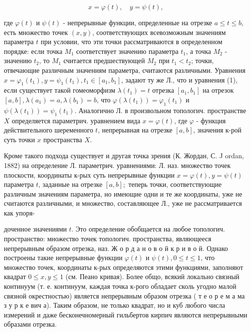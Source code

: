 \documentclass[10pt]{article}
\begin{document}
\[

x=\varphi(t), \quad y=\psi(t),

\]



где $\varphi(t)$ и $\psi(t)$ - непрерывные функции, определенные на отрезке $a \leqslant t \leqslant b$, есть множество точек $(x, y)$, соответствующих всевозможным значениям параметра $t$ при условии, что эти точки рассматриваются в определенном порядке: если точка $M_{1}$ соответствует значению параметра $t_{1}$, а точка $M_{2}$ - значению $t_{2}$, то $M_{1}$ считается предшествующей $M_{2}$ при $t_{1}<t_{2}$; точки, отвечающие различным значениям параметра, считаются различными. Уравнения $x=\varphi_{1}\left(t_{1}\right), y=\psi_{1}\left(t_{1}\right), t_{1} \in\left[a_{1}, b_{1}\right]$, задают ту же Л., что и уравнения (1), если существует такой гомеоморфизм $\lambda\left(t_{1}\right)=t$ отрезка $\left[a_{1}, b_{1}\right]$ на отрезок $[a, b], \lambda\left(a_{1}\right)=a, \lambda\left(b_{1}\right)=b$, что $\varphi\left(\lambda\left(t_{1}\right)\right)=\varphi_{1}\left(t_{1}\right)$ и $\psi\left(\lambda\left(t_{1}\right)\right)=\psi_{1}\left(t_{1}\right)$. Аналогично Л. в произвольном топологич. пространстве $X$ определяется параметрич. уравнением вида $x=\varphi(t)$, где $\varphi$ - функция действительного шеременного $t$, непрерывная на отрезке $[a, b]$, значения к-рой суть точки $x$ пространства $X$.



Кроме такого подхода существует и другая точка зрения (К. Жордан, С. J ordan, 1882) на определение Л. параметрич. уравнениями: Л. наз. множество точек плоскости, координаты к-рых суть непрерывные функции $x=\varphi(t), y=\psi(t)$ параметра $t$, заданные на отрезке $[a, b] ;$ теперь точки, соответствующие различным значениям параметра, но имеющие одни и те же координаты, уже не считаются различными, и множество, составляющее Л., уже не рассматривается как упоря-



доченное значениями $t$. Это определение обобщается на любое топологич. пространство: множество точек топологич. пространства, являющееся непрерывным образом отрезка, наз. Ж о р д а н о в о й к р и в о й. Однако построены такие непрерывные функции $\varphi(t)$ и $\psi(t), 0 \leqslant t \leqslant 1$, что множество точек, координаты к-рых определяются этими функциями, заполняют квадрат $0 \leqslant x, y \leqslant 1$ (см. Пеано кривая). Более общо, всякий локально связный континуум (т. е. континуум, каждая точка к-рого обладает сколь угодно малой связной окрестностью) является непрерывным образом отрезка ( т е о р е м а ма з у р к е вич а). Таким образом, не только квадрат, но и куб любого числа измерений и даже бесконечномерный гильбертов кирпич являются непрерывными образами отрезка.
\end{document}
